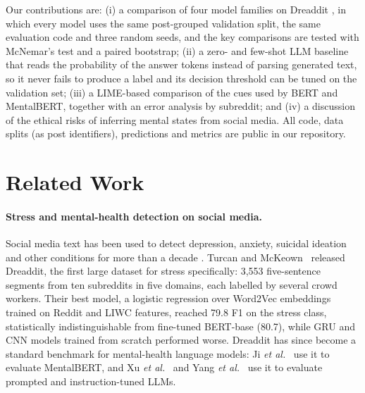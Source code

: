 Our contributions are:
(i) a comparison of four model families on Dreaddit \cite{turcan2019dreaddit}, in which every model
uses the same post-grouped validation split, the same evaluation code and three random seeds, and
the key comparisons are tested with McNemar's test and a paired bootstrap;
(ii) a zero- and few-shot LLM baseline that reads the probability of the answer tokens instead of
parsing generated text, so it never fails to produce a label and its decision threshold can be
tuned on the validation set;
(iii) a LIME-based comparison of the cues used by BERT and MentalBERT, together with an error
analysis by subreddit; and
(iv) a discussion of the ethical risks of inferring mental states from social media.
All code, data splits (as post identifiers), predictions and metrics are public in our repository.

\section{Related Work}

\paragraph{Stress and mental-health detection on social media.}
Social media text has been used to detect depression, anxiety, suicidal ideation and other
conditions for more than a decade \cite{coppersmith2014quantifying,guntuku2017detecting}.
Turcan and McKeown~ released Dreaddit, the first large dataset for stress specifically: 3,553
five-sentence segments from ten subreddits in five domains, each labelled by several crowd workers.
Their best model, a logistic regression over Word2Vec embeddings trained on Reddit and LIWC
features, reached 79.8 F1 on the stress class, statistically indistinguishable from fine-tuned
BERT-base (80.7), while GRU and CNN models trained from scratch performed worse.
Dreaddit has since become a standard benchmark for mental-health language models:
Ji {\it et al.}~ use it to evaluate MentalBERT, and Xu {\it et al.}~ and
Yang {\it et al.}~ use it to evaluate prompted and instruction-tuned LLMs.


